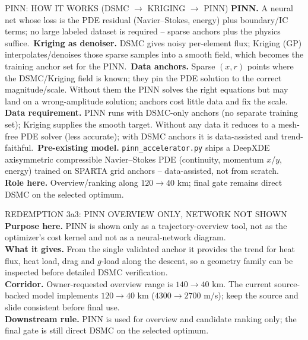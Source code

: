 \documentclass[aspectratio=169,11pt]{beamer}
\begin{document}
\begin{frame}{PINN: HOW IT WORKS (DSMC $\to$ KRIGING $\to$ PINN)}
  \small
  \textbf{PINN.} A neural net whose loss is the PDE residual (Navier--Stokes,
  energy) plus boundary/IC terms; no large labeled dataset is required -- sparse
  anchors plus the physics suffice.\
  \textbf{Kriging as denoiser.} DSMC gives noisy per-element flux; Kriging (GP)
  interpolates/denoises those sparse samples into a smooth field, which becomes
  the training anchor set for the PINN.\
  \textbf{Data anchors.} Sparse $(x,r)$ points where the DSMC/Kriging field is
  known; they pin the PDE solution to the correct magnitude/scale. Without them
  the PINN solves the right equations but may land on a wrong-amplitude solution;
  anchors cost little data and fix the scale.\\
  \textbf{Data requirement.} PINN runs with DSMC-only anchors (no separate
  training set); Kriging supplies the smooth target. Without any data it reduces
  to a mesh-free PDE solver (less accurate); with DSMC anchors it is
  data-assisted and trend-faithful.\
\textbf{Pre-existing model.} \texttt{pinn\_accelerator.py} ships a DeepXDE
  axisymmetric compressible Navier--Stokes PDE (continuity, momentum $x$/$y$,
  energy) trained on SPARTA grid anchors -- data-assisted, not from scratch.\\
  \textbf{Role here.} Overview/ranking along $120\rightarrow40$ km; final gate
  remains direct DSMC on the selected optimum.
\end{frame}

\begin{frame}{REDEMPTION 3a3: PINN OVERVIEW ONLY, NETWORK NOT SHOWN}
  \small
  \textbf{Purpose here.} PINN is shown only as a trajectory-overview tool, not
  as the optimizer's cost kernel and not as a neural-network diagram.\\
  \textbf{What it gives.} From the single validated anchor it provides the trend
  for heat flux, heat load, drag and $g$-load along the descent, so a geometry
  family can be inspected before detailed DSMC verification.\\
  \textbf{Corridor.} Owner-requested overview range is $140\rightarrow40$ km.
  The current source-backed model implements $120\rightarrow40$ km
  ($4300\rightarrow2700$ m/s); keep the source and slide consistent before final use.\\
  \textbf{Downstream rule.} PINN is used for overview and candidate ranking only;
  the final gate is still direct DSMC on the selected optimum.
\end{frame}
\end{document}
